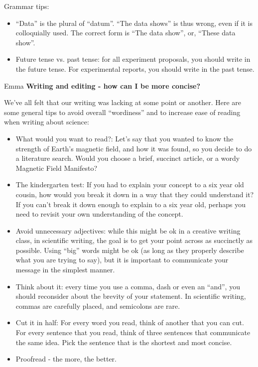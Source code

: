Grammar tips: %
\begin{itemize}
\item ``Data'' is the plural of ``datum''. ``The data shows'' is thus wrong, even if it is colloquially used. The correct form is ``The data show'', or, ``These data show''.
\item Future tense vs. past tense: for all experiment proposals, you should write in the future tense. For experimental reports, you should write in the past tense. 
\end{itemize}

\begin{studentOpinion}{Emma}
\textbf{Writing and editing - how can I be more concise?}

We've all felt that our writing was lacking at some point or another. Here are some general tips to avoid overall ``wordiness'' and to increase ease of reading when writing about science: 

\begin{itemize}
\item What would you want to read?: Let's say that you wanted to know the strength of Earth's magnetic field, and how it was found, so you decide to do a literature search. Would you choose a brief, succinct article, or a wordy Magnetic Field Manifesto?
\item The kindergarten test: If you had to explain your concept to a six year old cousin, how would you break it down in a way that they could understand it? If you can't break it down enough to explain to a six year old, perhaps you need to revisit your own understanding of the concept.
\item Avoid unnecessary adjectives: while this might be ok in a creative writing class, in scientific writing, the goal is to get your point across as succinctly as possible. Using ``big'' words might be ok (as long as they properly describe what you are trying to say), but it is important to communicate your message in the simplest manner. 
\item Think about it: every time you use a comma, dash or even an ``and'', you should reconsider about the brevity of your statement. In scientific writing, commas are carefully placed, and semicolons are rare. 
\item Cut it in half: For every word you read, think of another that you can cut. For every sentence that you read, think of three sentences that communicate the same idea. Pick the sentence that is the shortest and most concise. 
\item Proofread - the more, the better.
\end{itemize}
\end{studentOpinion}

